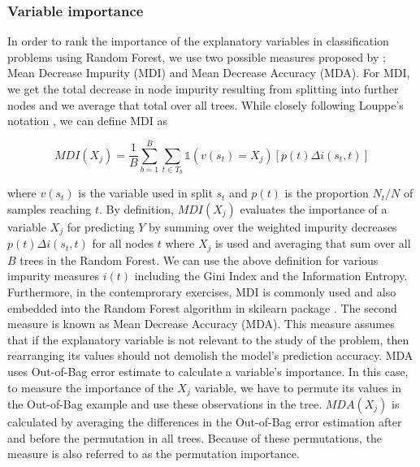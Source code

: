 \subsubsection{Variable importance}
In order to rank the importance of the explanatory variables in classification problems using Random Forest, 
we use two possible measures proposed by \cite{breiman2001random}; 
Mean Decrease Impurity (MDI) and Mean Decrease Accuracy (MDA).
For MDI, we get the total decrease in node impurity 
resulting from splitting into further nodes and we average that total over all trees. 
While closely following Louppe's notation \cite{louppe2013understanding}, 
we can define MDI as

\begin{equation}\label{eq:MDI}
	{MDI}( X_{j} ) = \frac{1}{B} \sum_{b=1}^{B} \sum_{t \in T_{b}}\mathds{1}(v(s_{t})=  X_{j}) [p(t)\Delta i(s_{t}, t)]
\end{equation}

where $v(s_{t})$ is the variable used in split $s_{t}$ and $ p(t) $ is the proportion $N_{t}/N$ of samples reaching $t$.
By definition, $MDI( X_{j} )$ evaluates the importance of a variable $X_{j}$ for predicting $Y$ by 
summing over the weighted impurity decreases $p(t) \Delta i(s_{t}, t)$ for all nodes $t$ where $ X_{j}$ is used 
and averaging that sum over all $B$ trees in the Random Forest. 
We can use the above definition for various impurity measures $i(t)$ including the Gini Index and the Information Entropy. 
Furthermore, in the contemprorary exercises, MDI is commonly used and also embedded into the Random Forest algorithm 
in skilearn package \cite{scikit2011learn}.
The second measure is known as Mean Decrease Accuracy (MDA).
This measure assumes that if the explanatory variable is not relevant to the study of the problem,
then rearranging its values should not demolish the model's prediction accuracy.
MDA uses Out-of-Bag error estimate to calculate a variable's importance.
In this case, to measure the importance of the $X_{j}$ variable, we have to permute its values in the Out-of-Bag example and 
use these observations in the tree. $ MDA( X_{j} )$ is calculated by averaging the differences in the
Out-of-Bag error estimation after and before the permutation in all trees. Because of these permutations, 
the measure is also referred to as the permutation importance.

